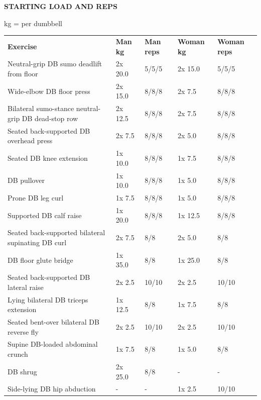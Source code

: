 \documentclass[11pt,a4paper]{article}
\begin{document}
\clearpage
\begin{center}
{\fontsize{22}{26}\selectfont\bfseries STARTING LOAD AND REPS}
\end{center}

\vspace{0.34cm}
\noindent\hfill{\fontsize{8.6}{10.1}\selectfont\color{muted}kg = per dumbbell}

\vspace{0.30cm}
\setlength{\arrayrulewidth}{0.45pt}
{\fontsize{9.0}{10.6}\selectfont
\renewcommand{\arraystretch}{3.30}
\setlength{\tabcolsep}{3.5pt}
\begin{tabular}{@{}>{\raggedright\arraybackslash}m{9.65cm} C{1.45cm} C{1.65cm}!{\color{blockrule}\vrule width 0.65pt}C{1.45cm} C{1.75cm}@{}}
\textbf{Exercise} & \textbf{Man kg} & \textbf{Man reps} & \textbf{Woman kg} & \textbf{Woman reps} \\
Neutral-grip DB sumo deadlift from floor & 2x 20.0 & 5/5/5 & 2x 15.0 & 5/5/5 \\
\hline
Wide-elbow DB floor press & 2x 15.0 & 8/8/8 & 2x 7.5 & 8/8/8 \\
\hline
Bilateral sumo-stance neutral-grip DB dead-stop row & 2x 12.5 & 8/8/8 & 2x 7.5 & 8/8/8 \\
\hline
Seated back-supported DB overhead press & 2x 7.5 & 8/8/8 & 2x 5.0 & 8/8/8 \\
\hline
Seated DB knee extension & 1x 10.0 & 8/8/8 & 1x 7.5 & 8/8/8 \\
\hline
DB pullover & 1x 10.0 & 8/8/8 & 1x 5.0 & 8/8/8 \\
\hline
Prone DB leg curl & 1x 7.5 & 8/8/8 & 1x 5.0 & 8/8/8 \\
\hline
Supported DB calf raise & 1x 20.0 & 8/8/8 & 1x 12.5 & 8/8/8 \\
\hline
Seated back-supported bilateral supinating DB curl & 2x 7.5 & 8/8 & 2x 5.0 & 8/8 \\
\hline
DB floor glute bridge & 1x 35.0 & 8/8 & 1x 25.0 & 8/8 \\
\hline
Seated back-supported DB lateral raise & 2x 2.5 & 10/10 & 2x 2.5 & 10/10 \\
\hline
Lying bilateral DB triceps extension & 1x 12.5 & 8/8 & 1x 7.5 & 8/8 \\
\hline
Seated bent-over bilateral DB reverse fly & 2x 2.5 & 10/10 & 2x 2.5 & 10/10 \\
\hline
Supine DB-loaded abdominal crunch & 1x 7.5 & 8/8 & 1x 5.0 & 8/8 \\
\hline
DB shrug & 2x 25.0 & 8/8 & - & - \\
\hline
Side-lying DB hip abduction & - & - & 1x 2.5 & 10/10 \\
\end{tabular}\par
}
\end{document}
